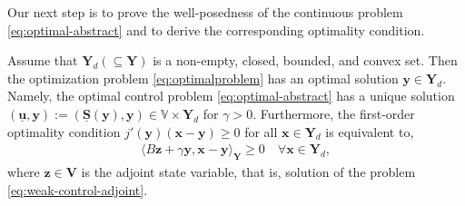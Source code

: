\documentclass[smallextended]{svjour3}
\numberwithin{equation}{section}
\numberwithin{figure}{section}
\numberwithin{table}{section}
\newcommand{\buS}{\underline{\boldsymbol{S}}}
\newcommand\bV{\mathbf{V}}
\newcommand\buu{\underline{\boldsymbol{u}}}
\newcommand\bx{\boldsymbol{x}}
\newcommand\by{\boldsymbol{y}}
\newcommand\bu{\boldsymbol{u}}
\newcommand\bz{\boldsymbol{z}}
\newcommand{\bYd}{\boldsymbol{Y}_d}
\newcommand{\bY}{\boldsymbol{Y}}
\newcommand{\bbV}{\mathbb{V}}
\begin{document}
\smallskip        
    Our next step is to prove the well-posedness of the continuous problem \eqref{eq:optimal-abstract} and to derive the corresponding optimality condition.
	\begin{theorem} \label{thm:opt-equiv}
    Assume that $\bYd (\subseteq \bY)$ is a non-empty, closed, bounded, and convex set. 
    Then the optimization problem \eqref{eq:optimalproblem} has an optimal solution $\by \in \bYd$.
    Namely, the optimal control problem \eqref{eq:optimal-abstract} has a unique solution
		$(\buu, \by):= (\buS (\by), \by) \in \bbV \times \bYd$ for $\gamma>0$.
		  Furthermore, the first-order optimality condition $j'(\by)(\bx - \by)\ge 0 $ for all $ \bx \in \bYd$ is equivalent to,
		\begin{align}\label{eq:optimality}
			\langle B \bz+ \gamma \by, \bx - \by \rangle_{\bY} \ge 0 \quad \forall \bx \in \bYd,
		\end{align}
		where $\bz \in \bV$ is the adjoint state variable, that is, solution of the problem \eqref{eq:weak-control-adjoint}.
	\end{theorem}
\end{document}
